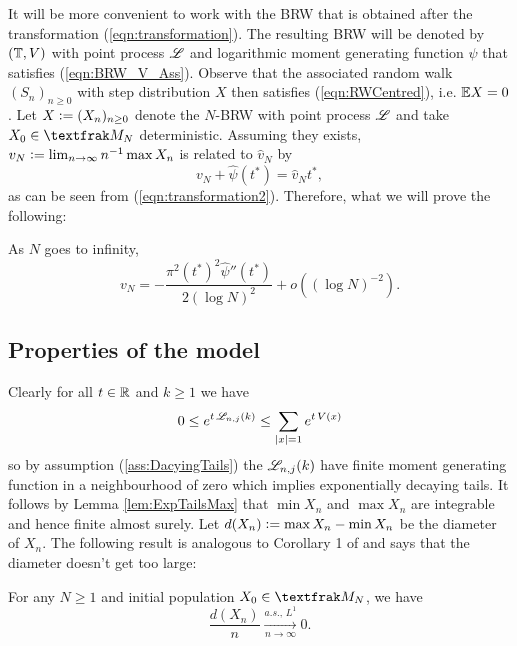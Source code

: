 It will be more convenient to work with the BRW that is obtained after the transformation (\ref{eqn:transformation}). The resulting BRW will be denoted by $(\mathbb{T}, V)$ with point process $\mathscr{L}$ and logarithmic moment generating function $\psi$ that satisfies (\ref{eqn:BRW_V_Ass}). Observe that the associated random walk $(S_n)_{n \geq 0}$ with step distribution $X$ then satisfies (\ref{eqn:RWCentred}), i.e. $\mathbb{E} X = 0$. Let $X \vcentcolon= (X_n)_{n \geq 0}$ denote the $N$-BRW with point process $\mathscr{L}$ and take $X_0 \in \frak{M}_N$ deterministic. Assuming they exists, $v_N \vcentcolon= \lim_{n \to \infty} n^{-1} \max X_n$ is related to $\hat{v}_N$ by 
\begin{equation}\label{eqn:speed_relation}
v_N + \widehat{\psi}(t^*)= \hat{v}_N t^*, 
\end{equation}
as can be seen from (\ref{eqn:transformation2}). Therefore, what we will prove the following:
\begin{theorem} \label{thm:ExpTails_BrunDer}
As $N$ goes to infinity, 
\begin{equation}\nonumber
v_N = - \frac{\pi^2 (t^*)^2 \widehat{\psi}''(t^*)} {2 (\log N)^2} + o((\log N)^{-2}). 
\end{equation}
\end{theorem}

\subsection{Properties of the model}
Clearly for all $t\in\mathbb{R}$ and $k \geq 1$ we have 
\begin{equation}\nonumber
0 \leq e^{t\, \mathscr{L}_{n,j}(k)} \leq \sum_{|x|=1} e^{t\, V(x)}
\end{equation} so by assumption (\ref{ass:DacyingTails}) the $\mathscr{L}_{n,j}(k)$ have finite moment generating function in a neighbourhood of zero which implies exponentially decaying tails. It follows by Lemma \ref{lem:ExpTailsMax} that $\min X_n$ and $\max X_n$ are integrable and hence finite almost surely. Let $d(X_n) \vcentcolon= \max X_n - \min X_n$ be the diameter of $X_n$. The following result is analogous to Corollary 1 of \cite{exp_tails} and says that the diameter doesn't get too large:

\begin{proposition}\label{prop:diameter}
For any $N \geq 1$ and initial population $X_0 \in \frak{M}_N$, we have 
\begin{equation}\nonumber
\frac{d(X_n)}{n} \xrightarrow[n \to \infty]{a.s.,\, L^1} 0. 
\end{equation}
\end{proposition}

